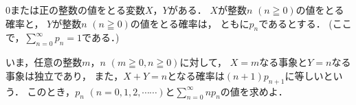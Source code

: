 \documentclass[../../main.tex]{subfiles}
\begin{document}
0または正の整数の値をとる変数$X$，$Y$がある．
$X$が整数$n$ $(n\geqq0)$の値をとる確率と，
$Y$が整数$n$ $(n\geqq0)$の値をとる確率は，
ともに$p_n$であるとする．
(ここで，$\displaystyle\sum_{n=0}^\infty p_n=1$である．)

いま，任意の整数$m$，$n$ $(m\geqq0,n\geqq0)$に対して，
$X=m$なる事象と$Y=n$なる事象は独立であり，
また，$X+Y=n$となる確率は$(n+1)p_{n+1}$に等しいという．
このとき，$p_n$ $(n=0,1,2,\cdots\cdots)$と$\displaystyle\sum_{n=0}^\infty np_n$の値を求めよ．
\end{document}
